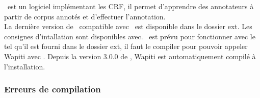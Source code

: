 \documentclass[manual-fr.tex]{subfiles}
\begin{document}
\WapitiCite\ est un logiciel implémentant les CRF, il permet d'apprendre des annotateurs à partir de corpus annotés et d'effectuer l'annotation.\\

La dernière version de \Wapiti\ compatible avec \SEM\ est disponible dans le
dossier ext. Les consignes d'intallation sont disponibles avec. \SEM\ est prévu
pour fonctionner avec le \Wapiti tel qu'il est fourni dans le dossier ext,
il faut le compiler pour pouvoir appeler Wapiti avec \SEM. Depuis la version 3.0.0 de \SEM, Wapiti est automatiquement compilé à l'installation.

\subsubsection{Erreurs de compilation}

\end{document}
